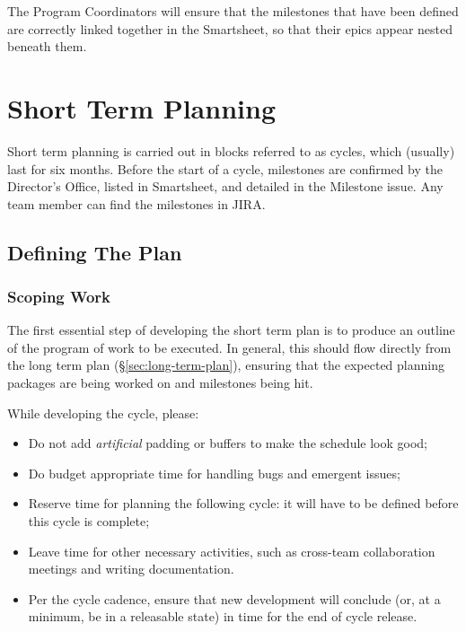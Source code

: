 The Program Coordinators will ensure that the milestones that have been defined are correctly linked together in the Smartsheet, so that their epics appear nested beneath them.


\section{Short Term Planning} \label{sec:cycle-plan}

Short term planning is carried out in blocks referred to as \glspl{cycle}, which (usually) last for six months.
Before the start of a \gls{cycle}, milestones are confirmed by the Director's Office, listed in Smartsheet, and detailed in the Milestone issue. Any team member can find the milestones in \gls{JIRA}.

\subsection{Defining The Plan}

\subsubsection{Scoping Work}

The first essential step of developing the short term plan is to produce an outline of the program of work to be executed.
In general, this should flow directly from the long term plan (\S\ref{sec:long-term-plan}), ensuring that the expected planning packages are being worked on and milestones being hit.

While developing the \gls{cycle}, please:

\begin{itemize}
\item Do not add \emph{artificial} padding or buffers to make the schedule look good;
\item Do budget appropriate time for handling bugs and emergent issues;
\item Reserve time for planning the following \gls{cycle}: it will have to be defined before this \gls{cycle} is complete;
\item Leave time for other necessary activities, such as cross-team collaboration meetings and writing documentation.
\item Per the \gls{cycle} cadence, ensure that new development will conclude (or, at a minimum, be in a releasable state) in time for the end of \gls{cycle} release.
\end{itemize}

